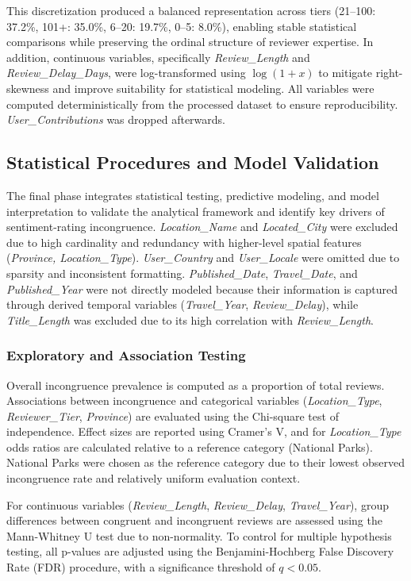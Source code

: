 \documentclass[conference]{IEEEtran}
\begin{document}
This discretization produced a balanced representation across tiers (21--100: 37.2\%, 101+: 35.0\%, 6--20: 19.7\%, 0--5: 8.0\%), enabling stable statistical comparisons while preserving the ordinal structure of reviewer expertise. In addition, continuous variables, specifically \textit{Review\_Length} and \textit{Review\_Delay\_Days}, were log-transformed using $\log(1+x)$ to mitigate right-skewness and improve suitability for statistical modeling. All variables were computed deterministically from the processed dataset to ensure reproducibility. \textit{User\_Contributions} was dropped afterwards.

\subsection{Statistical Procedures and Model Validation}
The final phase integrates statistical testing, predictive modeling, and model interpretation to validate the analytical framework and identify key drivers of sentiment-rating incongruence. \textit{Location\_Name} and \textit{Located\_City} were excluded due to high cardinality and redundancy with higher-level spatial features (\textit{Province, Location\_Type}). \textit{User\_Country} and \textit{User\_Locale} were omitted due to sparsity and inconsistent formatting. \textit{Published\_Date}, \textit{Travel\_Date}, and \textit{Published\_Year} were not directly modeled because their information is captured through derived temporal variables (\textit{Travel\_Year}, \textit{Review\_Delay}), while \textit{Title\_Length} was excluded due to its high correlation with \textit{Review\_Length}.

\subsubsection{Exploratory and Association Testing}
Overall incongruence prevalence is computed as a proportion of total reviews. Associations between incongruence and categorical variables (\textit{Location\_Type}, \textit{Reviewer\_Tier}, \textit{Province}) are evaluated using the Chi-square test of independence. Effect sizes are reported using Cramer's V, and for \textit{Location\_Type} odds ratios are calculated relative to a reference category (National Parks). National Parks were chosen as the reference category due to their lowest observed incongruence rate and relatively uniform evaluation context.

For continuous variables (\textit{Review\_Length}, \textit{Review\_Delay}, \textit{Travel\_Year}), group differences between congruent and incongruent reviews are assessed using the Mann-Whitney U test due to non-normality. To control for multiple hypothesis testing, all p-values are adjusted using the Benjamini-Hochberg False Discovery Rate (FDR) procedure, with a significance threshold of $q<0.05$.
\end{document}
